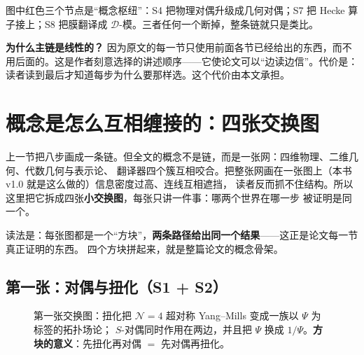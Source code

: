 \begin{center}
\end{center}

图中红色三个节点是“概念枢纽”：S4 把物理对偶升级成几何对偶；S7 把 Hecke 算子接上；S8 把膜翻译成 $\mathcal{D}$-模。三者任何一个断掉，整条链就只是类比。

\begin{keyidea}
\textbf{为什么主链是线性的？} 因为原文的每一节只使用前面各节已经给出的东西，而不用后面的。这是作者刻意选择的讲述顺序——它使论文可以“边读边信”。代价是：读者读到最后才知道每步为什么要那样选。这个代价由本文承担。
\end{keyidea}

\section{概念是怎么互相缠接的：四张交换图}

上一节把八步画成一条链。但全文的概念不是链，而是一张网：四维物理、二维几何、代数几何与表示论、
翻译器四个簇互相咬合。把整张网画在一张图上（本书 v1.0 就是这么做的）信息密度过高、连线互相遮挡，
读者反而抓不住结构。所以这里把它拆成四张\textbf{小交换图}，每张只讲一件事：哪两个世界在哪一步
被证明是同一个。

读法是：每张图都是一个“方块”，\textbf{两条路径给出同一个结果}——这正是论文每一节真正证明的东西。
四个方块拼起来，就是整篇论文的概念骨架。

\subsection{第一张：对偶与扭化（S1 + S2）}

\begin{figure}[htbp]
\centering
{}
\caption{第一张交换图：扭化把 $\mathcal{N}=4$ 超对称 Yang--Mills 变成一族以 $\Psi$ 为标签的拓扑场论；
$S$-对偶同时作用在两边，并且把 $\Psi$ 换成 $1/\Psi$。\textbf{方块的意义}：先扭化再对偶 $=$ 先对偶再扭化。}
\label{fig:concept-1}
\end{figure}

